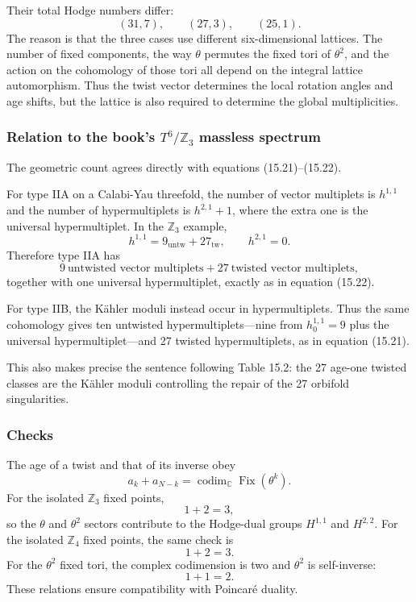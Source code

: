 \documentclass[
  10pt,
  a4paper,
  openany]{book}
\begin{document}
Their total Hodge numbers differ: \[
(31,7),
\qquad
(27,3),
\qquad
(25,1).
\] The reason is that the three cases use different six-dimensional
lattices. The number of fixed components, the way \(\theta\) permutes
the fixed tori of \(\theta^2\), and the action on the cohomology of
those tori all depend on the integral lattice automorphism. Thus the
twist vector determines the local rotation angles and age shifts, but
the lattice is also required to determine the global multiplicities.

\subsubsection{\texorpdfstring{Relation to the book's
\(T^6/\mathbb Z_3\) massless
spectrum}{Relation to the book's T\^{}6/\textbackslash mathbb Z\_3 massless spectrum}}\label{relation-to-the-books-t6mathbb-z_3-massless-spectrum}

The geometric count agrees directly with equations (15.21)--(15.22).

For type IIA on a Calabi-Yau threefold, the number of vector multiplets
is \(h^{1,1}\) and the number of hypermultiplets is \(h^{2,1}+1\), where
the extra one is the universal hypermultiplet. In the \(\mathbb Z_3\)
example, \[
h^{1,1}=9_{\mathrm{untw}}+27_{\mathrm{tw}},
\qquad
h^{2,1}=0.
\] Therefore type IIA has \[
9\ \text{untwisted vector multiplets}
+
27\ \text{twisted vector multiplets},
\] together with one universal hypermultiplet, exactly as in equation
(15.22).

For type IIB, the Kähler moduli instead occur in hypermultiplets. Thus
the same cohomology gives ten untwisted hypermultiplets---nine from
\(h_0^{1,1}=9\) plus the universal hypermultiplet---and 27 twisted
hypermultiplets, as in equation (15.21).

This also makes precise the sentence following Table 15.2: the 27
age-one twisted classes are the Kähler moduli controlling the repair of
the 27 orbifold singularities.

\subsubsection{Checks}\label{checks-17}

The age of a twist and that of its inverse obey \[
a_k+a_{N-k}
=
\operatorname{codim}_{\mathbb C}\operatorname{Fix}(\theta^k).
\] For the isolated \(\mathbb Z_3\) fixed points, \[
1+2=3,
\] so the \(\theta\) and \(\theta^2\) sectors contribute to the
Hodge-dual groups \(H^{1,1}\) and \(H^{2,2}\). For the isolated
\(\mathbb Z_4\) fixed points, the same check is \[
1+2=3.
\] For the \(\theta^2\) fixed tori, the complex codimension is two and
\(\theta^2\) is self-inverse: \[
1+1=2.
\] These relations ensure compatibility with Poincaré duality.
\end{document}
